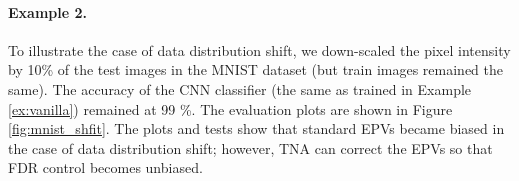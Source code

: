 \documentclass{article}
\begin{document}
%	
%	
%	
%	
	
\paragraph{Example 2.} To illustrate the case of data distribution shift, we down-scaled the pixel intensity by 10\% of the test images in the MNIST dataset (but train images remained the same). The accuracy of the CNN classifier (the same as trained in Example \ref{ex:vanilla}) remained at 99 \%. The evaluation plots are shown in Figure \ref{fig:mnist_shfit}. The plots and tests show that standard EPVs became biased in the case of data distribution shift; however, TNA can correct the EPVs so that FDR control becomes unbiased.
\end{document}
